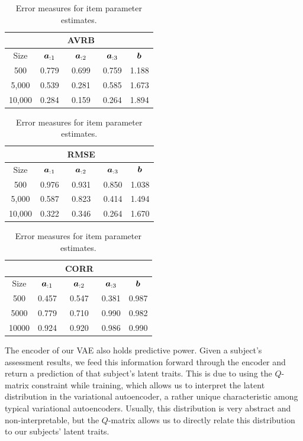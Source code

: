 \begin{table}[h]
\begin{center}
  \begin{tabular}{ccccc}
    \hline
    &&AVRB&&\\
    \hline
    Size  & $\boldsymbol{a}_{:1}$ & $\boldsymbol{a}_{:2}$ & $\boldsymbol{a}_{:3}$ & $\boldsymbol{b}$ \\
    \hline
    500   & 0.779 & 0.699 & 0.759 & 1.188 \\
    5,000 & 0.539 & 0.281 & 0.585 & 1.673 \\
    10,000  &0.284  & 0.159 & 0.264 & 1.894 \\
    \hline
  \end{tabular}
\end{center}

\begin{center}
  \begin{tabular}{ccccc}
    \hline
    &&RMSE&&\\
    \hline
    Size  & $\boldsymbol{a}_{:1}$ & $\boldsymbol{a}_{:2}$ & $\boldsymbol{a}_{:3}$ & $\boldsymbol{b}$ \\
    \hline
    500   & 0.976 & 0.931 & 0.850 & 1.038 \\
    5,000 & 0.587 & 0.823 & 0.414 & 1.494 \\
    10,000  & 0.322 & 0.346 & 0.264 & 1.670 \\
    \hline
  \end{tabular}
\end{center}

\begin{center}
  \begin{tabular}{ccccc}
    \hline
    &&CORR&&\\
    \hline
    Size  & $\boldsymbol{a}_{:1}$ & $\boldsymbol{a}_{:2}$ & $\boldsymbol{a}_{:3}$ & $\boldsymbol{b}$ \\
    \hline
    500   & 0.457 & 0.547 & 0.381 & 0.987 \\
    5000  & 0.779 & 0.710 & 0.990 & 0.982 \\
    10000   & 0.924 & 0.920 & 0.986 & 0.990 \\
    \hline
  \end{tabular}
\end{center}
\caption{Error measures for item parameter estimates.}
\label{tab:ijcnn_param}
\end{table}

The encoder of our VAE also holds predictive power. Given a subject's assessment results, we feed this information forward through the encoder and return a prediction of that subject's latent traits. This is due to using the $Q$-matrix constraint while training, which allows us to interpret the latent distribution in the variational autoencoder, a rather unique characteristic among typical variational autoencoders. Usually, this distribution is very abstract and non-interpretable, but the $Q$-matrix allows us to directly relate this distribution to our subjects' latent traits. 

